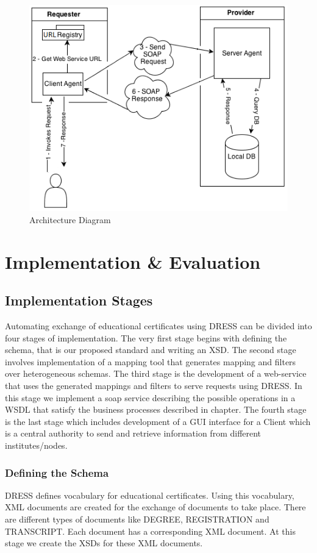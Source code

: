 \documentclass[12pt,a4paper,oneside]{book}
\begin{document}
\begin{figure}[!htp]
  \centering
  \includegraphics[width=12cm]{architecture.png}
  \caption{Architecture Diagram}
  \label{fig:architecture}
\end{figure}


\chapter{Implementation \& Evaluation}\label{ch-implement}


\section{Implementation Stages}
Automating exchange of educational certificates using DRESS can be divided into four stages of implementation. The very first stage begins with defining the schema, that is our proposed standard and writing an XSD. The second stage involves implementation of a mapping tool that generates mapping and filters over heterogeneous schemas. The third stage is the development of a web-service that uses the generated mappings and filters to serve requests using DRESS. In this stage we implement a soap service describing the possible operations in a WSDL that satisfy the business processes described in chapter. The fourth stage is the last stage which includes development of a GUI interface for a Client which is a central authority to send and retrieve information from different institutes/nodes.
 
\subsection{Defining the Schema}
DRESS defines vocabulary for educational certificates. Using this vocabulary, XML documents are created for the exchange of documents to take place. There are different types of documents like DEGREE, REGISTRATION and TRANSCRIPT. Each document has a corresponding XML document. At this stage we create the XSDs for these XML documents.
\end{document}
